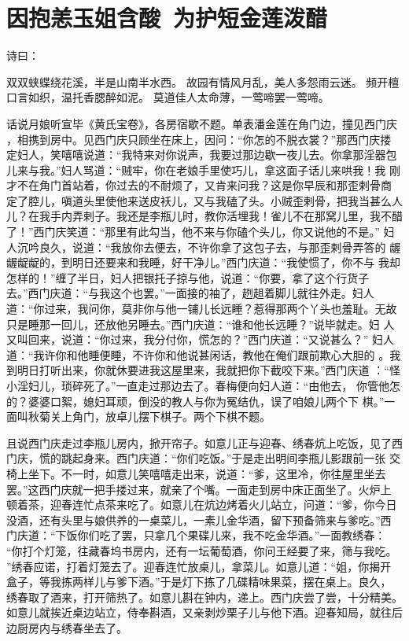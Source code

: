 \chapter{因抱恙玉姐含酸~为护短金莲泼醋}

诗曰：

双双蛱蝶绕花溪，半是山南半水西。
故园有情风月乱，美人多怨雨云迷。
频开檀口言如织，温托香腮醉如泥。
莫道佳人太命薄，一莺啼罢一莺啼。

话说月娘听宣毕《黄氏宝卷》，各房宿歇不题。单表潘金莲在角门边，撞见西门庆
，相携到房中。见西门庆只顾坐在床上，因问：“你怎的不脱衣裳？”那西门庆搂
定妇人，笑嘻嘻说道：“我特来对你说声，我要过那边歇一夜儿去。你拿那淫器包
儿来与我。”妇人骂道：“贼牢，你在老娘手里使巧儿，拿这面子话儿来哄我！我
刚才不在角门首站着，你过去的不耐烦了，又肯来问我？这是你早辰和那歪剌骨商
定了腔儿，嗔道头里使他来送皮袄儿，又与我磕了头。小贼歪剌骨，把我当甚么人
儿？在我手内弄剌子。我还是李瓶儿时，教你活埋我！雀儿不在那窝儿里，我不醋
了！”西门庆笑道：“那里有此勾当，他不来与你磕个头儿，你又说他的不是。”
妇人沉吟良久，说道：“我放你去便去，不许你拿了这包子去，与那歪剌骨弄答的
龌龌龊龊的，到明日还要来和我睡，好干净儿。”西门庆道：“我使惯了，你不与
我却怎样的！”缠了半日，妇人把银托子掠与他，说道：“你要，拿了这个行货子
去。”西门庆道：“与我这个也罢。”一面接的袖了，趔趄着脚儿就往外走。妇人
道：“你过来，我问你，莫非你与他一铺儿长远睡？惹得那两个丫头也羞耻。无故
只是睡那一回儿，还放他另睡去。”西门庆道：“谁和他长远睡？”说毕就走。妇
人又叫回来，说道：“你过来，我分付你，慌怎的？”西门庆道：“又说甚么？”
妇人道：“我许你和他睡便睡，不许你和他说甚闲话，教他在俺们跟前欺心大胆的
。我到明日打听出来，你就休要进我这屋里来，我就把你下截咬下来。”西门庆道
：“怪小淫妇儿，琐碎死了。”一直走过那边去了。春梅便向妇人道：“由他去，
你管他怎的？婆婆口絮，媳妇耳顽，倒没的教人与你为冤结仇，误了咱娘儿两个下
棋。”一面叫秋菊关上角门，放卓儿摆下棋子。两个下棋不题。

且说西门庆走过李瓶儿房内，掀开帘子。如意儿正与迎春、绣春炕上吃饭，见了西
门庆，慌的跳起身来。西门庆道：“你们吃饭。”于是走出明间李瓶儿影跟前一张
交椅上坐下。不一时，如意儿笑嘻嘻走出来，说道：“爹，这里冷，你往屋里坐去
罢。”这西门庆就一把手搂过来，就亲了个嘴。一面走到房中床正面坐了。火炉上
顿着茶，迎春连忙点茶来吃了。如意儿在炕边烤着火儿站立，问道：“爹，你今日
没酒，还有头里与娘供养的一桌菜儿，一素儿金华酒，留下预备筛来与爹吃。”西
门庆道：“下饭你们吃了罢，只拿几个果碟儿来，我不吃金华酒。”一面教绣春：
“你打个灯笼，往藏春坞书房内，还有一坛葡萄酒，你问王经要了来，筛与我吃。
”绣春应诺，打着灯笼去了。迎春连忙放桌儿，拿菜儿。如意儿道：“姐，你揭开
盒子，等我拣两样儿与爹下酒。”于是灯下拣了几碟精味果菜，摆在桌上。良久，
绣春取了酒来，打开筛热了。如意儿斟在钟内，递上。西门庆尝了尝，十分精美。
如意儿就挨近桌边站立，侍奉斟酒，又亲剥炒栗子儿与他下酒。迎春知局，就往后
边厨房内与绣春坐去了。

